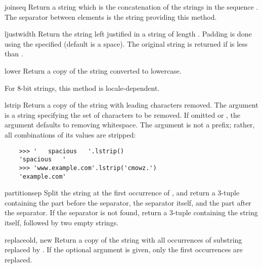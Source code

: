 \begin{methoddesc}[string]{join}{seq}
Return a string which is the concatenation of the strings in the
sequence .  The separator between elements is the string
providing this method.
\end{methoddesc}

\begin{methoddesc}[string]{ljust}{width}
Return the string left justified in a string of length .
Padding is done using the specified  (default is a
space).  The original string is returned if
 is less than .
\end{methoddesc}

\begin{methoddesc}[string]{lower}{}
Return a copy of the string converted to lowercase.

For 8-bit strings, this method is locale-dependent.
\end{methoddesc}

\begin{methoddesc}[string]{lstrip}{}
Return a copy of the string with leading characters removed.  The
 argument is a string specifying the set of characters
to be removed.  If omitted or , the  argument
defaults to removing whitespace.  The  argument is not
a prefix; rather, all combinations of its values are stripped:
\begin{verbatim}
    >>> '   spacious   '.lstrip()
    'spacious   '
    >>> 'www.example.com'.lstrip('cmowz.')
    'example.com'
\end{verbatim}
\end{methoddesc}

\begin{methoddesc}[string]{partition}{sep}
Split the string at the first occurrence of , and return
a 3-tuple containing the part before the separator, the separator
itself, and the part after the separator.  If the separator is not
found, return a 3-tuple containing the string itself, followed by
two empty strings.
\end{methoddesc}

\begin{methoddesc}[string]{replace}{old, new}
Return a copy of the string with all occurrences of substring
 replaced by .  If the optional argument
 is given, only the first  occurrences are
replaced.
\end{methoddesc}

